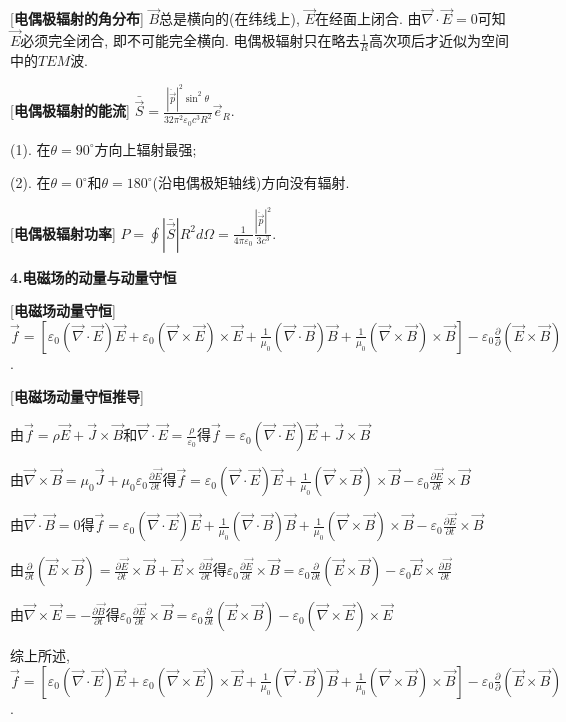 [\textbf{电偶极辐射的角分布}] $\vec B$总是横向的(在纬线上), $\vec E$在经面上闭合. 由$\vec\nabla\cdot\vec E=0$可知$\vec E$必须完全闭合, 即不可能完全横向. 电偶极辐射只在略去$\frac{1}{R}$高次项后才近似为空间中的$TEM$波.

[\textbf{电偶极辐射的能流}] $\bar{\vec S}=\frac{|\ddot{\vec p}|^2\sin^2\theta}{32\pi^2\varepsilon_0c^3R^2}\vec e_R$.\par
\qquad (1). 在$\theta=90^\circ$方向上辐射最强;\par
\qquad (2). 在$\theta=0^\circ$和$\theta=180^\circ$(沿电偶极矩轴线)方向没有辐射.\par

[\textbf{电偶极辐射功率}] $P=\oint|\bar{\vec S}|R^2d\Omega=\frac{1}{4\pi\varepsilon_0}\frac{|\ddot{\vec p}|^2}{3c^3}$.\par

\begin{center}
 \textbf{4.电磁场的动量与动量守恒}
\end{center}

[\textbf{电磁场动量守恒}] $\vec f=[\varepsilon_0(\vec\nabla\cdot\vec E)\vec E+\varepsilon_0(\vec\nabla\times\vec E)\times\vec E+\frac{1}{\mu_0}(\vec\nabla\cdot\vec B)\vec B+\frac{1}{\mu_0}(\vec\nabla\times\vec B)\times\vec B]-\varepsilon_0\frac{\partial}{\partial}(\vec E\times\vec B)$.\par

[\textbf{电磁场动量守恒推导}]\par
\qquad 由$\vec f=\rho\vec E+\vec J\times\vec B$和$\vec\nabla\cdot\vec E=\frac{\rho}{\varepsilon_0}$得$\vec f=\varepsilon_0(\vec\nabla\cdot\vec E)\vec E+\vec J\times\vec B$\par
\qquad 由$\vec\nabla\times\vec B=\mu_0\vec J+\mu_0\varepsilon_0\frac{\partial\vec E}{\partial t}$得$\vec f=\varepsilon_0(\vec\nabla\cdot\vec E)\vec E+\frac{1}{\mu_0}(\vec\nabla\times\vec B)\times\vec B-\varepsilon_0\frac{\partial\vec E}{\partial t}\times\vec B$\par
\qquad 由$\vec\nabla\cdot\vec B=0$得$\vec f=\varepsilon_0(\vec\nabla\cdot\vec E)\vec E+\frac{1}{\mu_0}(\vec\nabla\cdot\vec B)\vec B+\frac{1}{\mu_0}(\vec\nabla\times\vec B)\times\vec B-\varepsilon_0\frac{\partial\vec E}{\partial t}\times\vec B$\par
\qquad 由$\frac{\partial}{\partial t}(\vec E\times\vec B)=\frac{\partial\vec E}{\partial t}\times\vec B+\vec E\times\frac{\partial\vec B}{\partial t}$得$\varepsilon_0\frac{\partial\vec E}{\partial t}\times\vec B=\varepsilon_0\frac{\partial}{\partial t}(\vec E\times\vec B)-\varepsilon_0\vec E\times\frac{\partial\vec B}{\partial t}$\par
\qquad 由$\vec\nabla\times\vec E=-\frac{\partial\vec B}{\partial t}$得$\varepsilon_0\frac{\partial\vec E}{\partial t}\times\vec B=\varepsilon_0\frac{\partial}{\partial t}(\vec E\times\vec B)-\varepsilon_0(\vec\nabla\times\vec E)\times\vec E$\par
\qquad 综上所述, $\vec f=[\varepsilon_0(\vec\nabla\cdot\vec E)\vec E+\varepsilon_0(\vec\nabla\times\vec E)\times\vec E+\frac{1}{\mu_0}(\vec\nabla\cdot\vec B)\vec B+\frac{1}{\mu_0}(\vec\nabla\times\vec B)\times\vec B]-\varepsilon_0\frac{\partial}{\partial}(\vec E\times\vec B)$.\par

